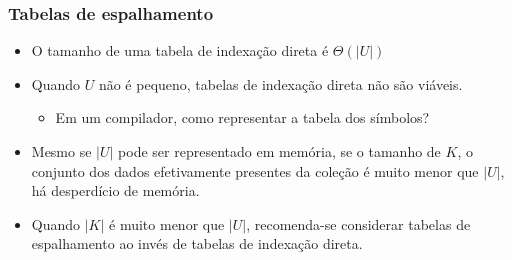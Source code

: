 \documentclass{beamer}
\begin{document}
\begin{frame}

  \frametitle{Tabelas de espalhamento}

  \begin{itemize}

    \item O tamanho de uma tabela de indexação direta é $\Theta(| U |)$

    \item Quando $U$ não é pequeno, tabelas de indexação direta não são
      viáveis.

      \begin{itemize}

        \item Em um compilador, como representar a tabela dos símbolos?

      \end{itemize}

    \item Mesmo se $| U |$ pode ser representado em memória, se o tamanho de
      $K$, o conjunto dos dados efetivamente presentes da coleção é muito menor
      que $| U |$, há desperdício de memória.

    \item Quando $| K |$ é muito menor que $| U |$, recomenda-se considerar
      \alert{tabelas de espalhamento} ao invés de tabelas de indexação direta.

  \end{itemize}

\end{frame}
\end{document}

